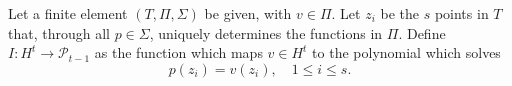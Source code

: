 \begin{defn}{\quad}
    Let a finite element $(T,\Pi, \Sigma)$ be given, with $v\in\Pi$.
    Let $z_i$ be the $s$ points in $T$ that, through all $p\in\Sigma$, 
    uniquely determines the functions in $\Pi$.
    Define $I: H^t \to \mathcal{P}_{t-1}$ as the function which maps $v\in H^t$ 
    to the polynomial which solves 
    \begin{equation*}
        p(z_i) = v(z_i), \quad 1\leq i \leq s.
    \end{equation*}
\end{defn}